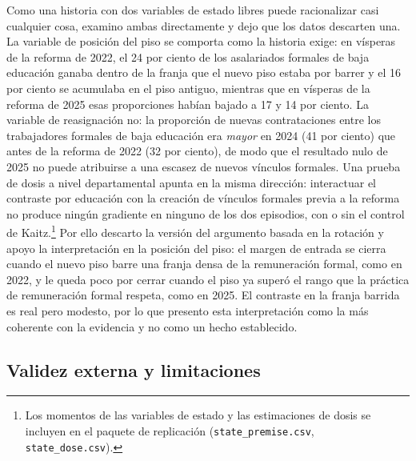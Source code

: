 Como una historia con dos variables de estado libres puede racionalizar casi cualquier cosa, examino ambas directamente y dejo que los datos descarten una. La variable de posición del piso se comporta como la historia exige: en vísperas de la reforma de 2022, el 24 por ciento de los asalariados formales de baja educación ganaba dentro de la franja que el nuevo piso estaba por barrer y el 16 por ciento se acumulaba en el piso antiguo, mientras que en vísperas de la reforma de 2025 esas proporciones habían bajado a 17 y 14 por ciento. La variable de reasignación no: la proporción de nuevas contrataciones entre los trabajadores formales de baja educación era \emph{mayor} en 2024 (41 por ciento) que antes de la reforma de 2022 (32 por ciento), de modo que el resultado nulo de 2025 no puede atribuirse a una escasez de nuevos vínculos formales. Una prueba de dosis a nivel departamental apunta en la misma dirección: interactuar el contraste por educación con la creación de vínculos formales previa a la reforma no produce ningún gradiente en ninguno de los dos episodios, con o sin el control de Kaitz.\footnote{Los momentos de las variables de estado y las estimaciones de dosis se incluyen en el paquete de replicación (\texttt{state\_premise.csv}, \texttt{state\_dose.csv}).} Por ello descarto la versión del argumento basada en la rotación y apoyo la interpretación en la posición del piso: el margen de entrada se cierra cuando el nuevo piso barre una franja densa de la remuneración formal, como en 2022, y le queda poco por cerrar cuando el piso ya superó el rango que la práctica de remuneración formal respeta, como en 2025. El contraste en la franja barrida es real pero modesto, por lo que presento esta interpretación como la más coherente con la evidencia y no como un hecho establecido.

\subsection{Validez externa y limitaciones}

